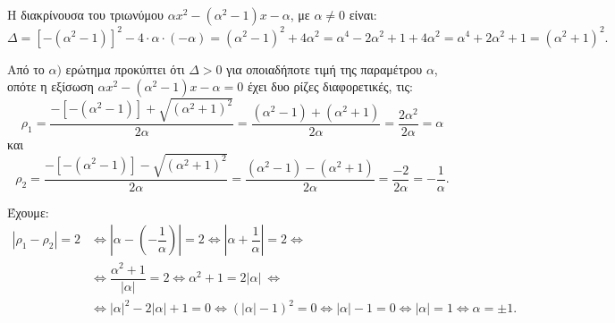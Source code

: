
\begin{alist}
\item Η διακρίνουσα του τριωνύμου $\alpha x^2 - (\alpha^2 - 1)x - \alpha$, με $\alpha \ne 0$ είναι:
\[\Delta = [-(\alpha^2 - 1)]^2 - 4 \cdot \alpha \cdot (-\alpha) = (\alpha^2 - 1)^2 + 4\alpha^2 = \alpha^4 - 2\alpha^2 + 1 + 4\alpha^2 = \alpha^4 + 2\alpha^2 + 1 = (\alpha^2 + 1)^2.\]

\item Από το $\alpha)$ ερώτημα προκύπτει ότι $\Delta > 0$ για οποιαδήποτε τιμή της παραμέτρου $\alpha$, οπότε
η εξίσωση $\alpha x^2 - (\alpha^2 - 1)x - \alpha = 0$ έχει δυο ρίζες διαφορετικές, τις:
\[\rho_1 = \dfrac{-[-(\alpha^2 - 1)] + \sqrt{(\alpha^2 + 1)^2}}{2\alpha} = \dfrac{(\alpha^2 - 1) + (\alpha^2 + 1)}{2\alpha} = \dfrac{2\alpha^2}{2\alpha} = \alpha\]
και
\[\rho_2 = \dfrac{-[-(\alpha^2 - 1)] - \sqrt{(\alpha^2 + 1)^2}}{2\alpha} = \dfrac{(\alpha^2 - 1) - (\alpha^2 + 1)}{2\alpha} = \dfrac{-2}{2\alpha} = -\dfrac{1}{\alpha}.\]

\item Έχουμε:
\begin{align*}
|\rho_1 - \rho_2| = 2 &\Leftrightarrow \left|\alpha - \left(-\dfrac{1}{\alpha}\right)\right| = 2 \Leftrightarrow \left|\alpha + \dfrac{1}{\alpha}\right| = 2 \Leftrightarrow \\&\Leftrightarrow\dfrac{\alpha^2 + 1}{|\alpha|} = 2 \Leftrightarrow \alpha^2 + 1 = 2|\alpha| \ \Leftrightarrow \\
&\Leftrightarrow|\alpha|^2 - 2|\alpha| + 1 = 0 \Leftrightarrow (|\alpha| - 1)^2 = 0 \Leftrightarrow |\alpha| - 1 = 0 \Leftrightarrow |\alpha| = 1 \Leftrightarrow \alpha = \pm 1.
\end{align*}
\end{alist}

